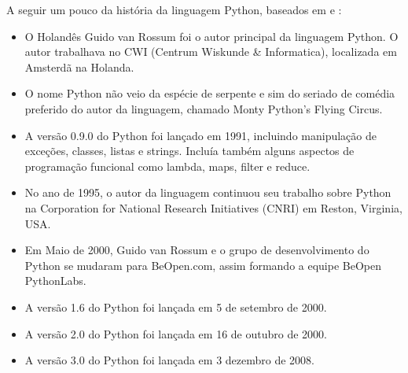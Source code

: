 A seguir um pouco da história da linguagem Python, baseados em \cite{Perkovic2016} e \cite{Borges2014} :
\begin{itemize}
  \item O Holandês Guido van Rossum foi o autor principal da linguagem Python. O autor trabalhava no CWI (Centrum Wiskunde \& Informatica), localizada em Amsterdã na Holanda.
  \item  O nome Python não veio da espécie de serpente e sim do seriado de comédia preferido do autor da linguagem, chamado Monty Python's Flying Circus.
  \item A versão 0.9.0 do Python foi lançado em 1991, incluindo manipulação de exceções, classes, listas e strings. Incluía também alguns aspectos de programação funcional como lambda, maps, filter e reduce.
  \item  No ano de 1995, o autor da linguagem continuou seu trabalho sobre Python na Corporation for National Research Initiatives (CNRI) em Reston, Virginia, USA.
  \item  Em Maio de 2000, Guido van Rossum e o grupo de desenvolvimento do Python se mudaram para BeOpen.com, assim formando a equipe BeOpen PythonLabs.
  \item A versão 1.6 do Python foi lançada em 5 de setembro de 2000.
  \item A versão 2.0  do Python foi lançada em 16 de outubro de 2000.
  \item A versão 3.0 do Python foi lançada em 3 dezembro de 2008.
\end{itemize}


